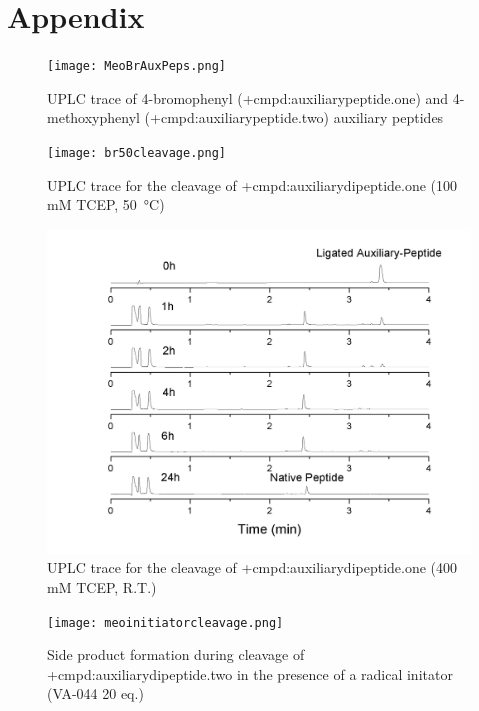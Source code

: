 \chapter{Appendix}

\ifpdf
    \graphicspath{{Appendix/AppendixFigs/PNG/}{Appendix/AppendixFigs/PDF/}{Appendix/AppendixFigs/}}
\else
    \graphicspath{{Appendix/AppendixFigs/EPS/}{Appendix/AppendixFigs/}}
\fi

  \begin{figure}[!htpb]
      \texttt{[image: MeoBrAuxPeps.png]}
      \caption{UPLC trace of 4-bromophenyl (\cmpd+{cmpd:auxiliarypeptide.one}) and 4-methoxyphenyl (\cmpd+{cmpd:auxiliarypeptide.two}) auxiliary peptides}
      \label{fig:auxpepuplc}
  \end{figure}

\begin{figure}
    \texttt{[image: br50cleavage.png]}
    \caption{UPLC trace for the cleavage of \cmpd+{cmpd:auxiliarydipeptide.one} (100 mM TCEP, \SI{50}{\celsius})}
    \label{fig:br50cleave100}
\end{figure}

\begin{figure}
    \includegraphics[max width=\linewidth]{brrtcleavage.png}
    \caption{UPLC trace for the cleavage of \cmpd+{cmpd:auxiliarydipeptide.one} (400 mM TCEP, R.T.)}
    \label{fig:brrtcleavage}
\end{figure}

\begin{figure}
    \texttt{[image: meoinitiatorcleavage.png]}
    \caption{Side product formation during cleavage of \cmpd+{cmpd:auxiliarydipeptide.two} in the presence of a radical initator (VA-044 20 eq.)}
    \label{fig:meoinitatorcleavage}
\end{figure}

